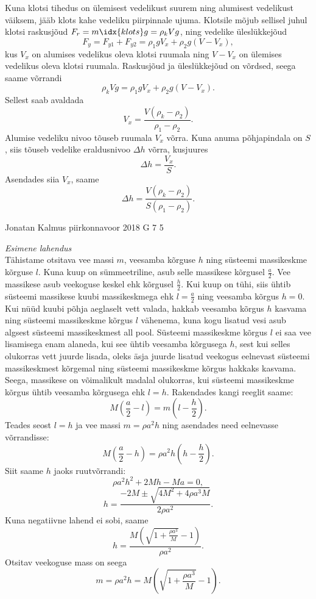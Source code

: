 \documentclass[11pt]{article}
\begin{document}
{{\ifSolution
Kuna klotsi tihedus on ülemisest vedelikust suurem ning alumisest vedelikust väiksem, jääb klots kahe vedeliku piirpinnale ujuma. Klotsile mõjub sellisel juhul klotsi raskusjõud $F_r = m\idx{klots}g=\rho_k Vg$, ning vedelike üleslükkejõud
\[ F_y=F_{y1}+F_{y2}=\rho_1gV_x + \rho_2g(V-V_x), \]
kus $V_x$ on alumises vedelikus oleva klotsi ruumala ning $V-V_x$ on ülemises vedelikus oleva klotsi ruumala.
Raskusjõud ja üleslükkejõud on võrdsed, seega saame võrrandi
\[ \rho_k Vg = \rho_1gV_x + \rho_2g(V-V_x). \]
Sellest saab avaldada 
\[ V_x = \frac{V(\rho_k-\rho_2)}{\rho_1-\rho_2}. \]
Alumise vedeliku nivoo tõuseb ruumala $V_x$ võrra. Kuna anuma põhjapindala on $S$, siis tõuseb vedelike eraldusnivoo $\Delta h$ võrra, kusjuures
\[ \Delta h = \frac{V_x}{S}. \]
Asendades siia $V_x$, saame
\[ \Delta h = \frac{V(\rho_k-\rho_2)}{S(\rho_1-\rho_2)}. \]
\fi
}

{Jonatan Kalmus} %
{piirkonnavoor} %
{2018} %
{G 7} %
{5} %
{

\ifSolution
\emph{Esimene lahendus}\\
Tähistame otsitava vee massi $m$, veesamba kõrguse $h$ ning süsteemi massikeskme kõrguse $l$. Kuna kuup on sümmeetriline, asub selle massikese kõrgusel $\frac{a}{2}$. Vee massikese asub veekoguse keskel ehk kõrgusel $\frac{h}{2}$. Kui kuup on tühi, siis ühtib süsteemi massikese kuubi massikeskmega ehk $l=\frac{a}{2}$ ning veesamba kõrgus $h=0$. Kui nüüd kuubi põhja aeglaselt vett valada, hakkab veesamba kõrgus $h$ kasvama ning süsteemi massikeskme kõrgus $l$ vähenema, kuna kogu lisatud vesi asub algsest süsteemi massikeskmest all pool. Süsteemi massikeskme kõrgus $l$ ei saa vee lisamisega enam alaneda, kui see ühtib veesamba kõrgusega $h$, sest kui selles olukorras vett juurde lisada, oleks äsja juurde lisatud veekogus eelnevast süsteemi massikeskmest kõrgemal ning süsteemi massikeskme kõrgus hakkaks kasvama. Seega, massikese on võimalikult madalal olukorras, kui süsteemi massikeskme kõrgus ühtib veesamba kõrgusega ehk $l=h$.
Rakendades kangi reeglit saame:
$$M(\frac{a}{2}-l)=m(l-\frac{h}{2}).$$ 
Teades seost $l=h$ ja vee massi $m=\rho a^2h$ ning asendades need eelnevasse võrrandisse:
$$M(\frac{a}{2}-h)=\rho a^2h(h-\frac{h}{2}).$$ 
Siit saame $h$ jaoks ruutvõrrandi:
$$\rho a^2h^2+2Mh-Ma=0,$$
$$h=\frac{-2M \pm \sqrt{4M^2+4\rho a^3M}}{2\rho a^2}.$$
Kuna negatiivne lahend ei sobi, saame
$$h=\frac{M(\sqrt{1+\frac{\rho a^3}{M}}-1)}{\rho a^2}.$$
Otsitav veekoguse mass on seega
$$m=\rho a^2h=M(\sqrt{1+\frac{\rho a^3}{M}}-1).$$

}}
\end{document}
